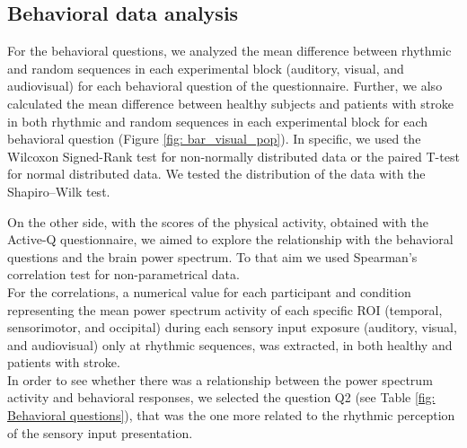 \subsection{Behavioral data analysis}
For the behavioral questions, we analyzed the mean difference between rhythmic and random sequences in each experimental block (auditory, visual, and audiovisual) for each behavioral question of the questionnaire. Further, we also calculated the mean difference between healthy subjects and patients with stroke in both rhythmic and random sequences in each experimental block for each behavioral question (Figure \ref{fig: bar_visual_pop}). In specific, we used the Wilcoxon Signed-Rank test for non-normally distributed data or the paired T-test for normal distributed data. We tested the distribution of the data with the Shapiro–Wilk test.

On the other side, with the scores of the physical activity, obtained with the Active-Q questionnaire, we aimed to explore the relationship with the behavioral questions and the brain power spectrum. To that aim we used Spearman’s correlation test for non-parametrical data. \\
For the correlations, a numerical value for each participant and condition representing the mean power spectrum activity of each specific ROI (temporal, sensorimotor, and occipital) during each sensory input exposure (auditory, visual, and audiovisual) only at rhythmic sequences, was extracted, in both healthy and patients with stroke. \\
In order to see whether there was a relationship between the power spectrum activity and behavioral responses, we selected the question Q2 (see Table \ref{fig: Behavioral questions}), that was the one more related to the rhythmic perception of the sensory input presentation. 